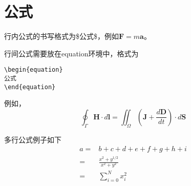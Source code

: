 \chapter{公式}

行内公式的书写格式为\${\kaishu 公式}\$，例如$\mathbf{F}=m\mathbf{a}$。

行间公式需要放在equation环境中，格式为
\begin{verbatim}
\begin{equation}
公式
\end{equation}
\end{verbatim}

例如，
\begin{equation}
\oint_{\Gamma}\mathbf{H}\cdot d\mathbf{l}=\iint_\Omega(\mathbf{J}+\frac{d\mathbf{D}}{dt})\cdot d\mathbf{S}
\end{equation}

多行公式例子如下
\begin{equation}
\begin{split}
a=&b+c+d+e+f+g+h+i\\
=&\frac{x^2+y^{1/2}}{x^2+y^2}\\
=&\sum_{i=0}^{N}x_i^2
\end{split}
\end{equation}
